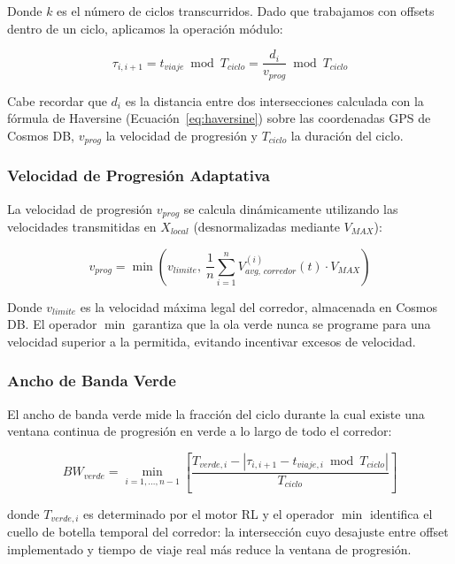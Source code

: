 \documentclass[12pt,a4paper,oneside]{report}
\begin{document}
Donde \(k\) es el número de ciclos transcurridos. Dado que trabajamos con offsets dentro de un ciclo, aplicamos la operación módulo:

\begin{equation}
\tau_{i,i + 1} = t_{viaje} \bmod T_{ciclo} = \frac{d_{i}}{v_{prog}} \bmod T_{ciclo}
\label{eq:offset}
\end{equation}

Cabe recordar que \(d_{i}\) es la distancia entre dos intersecciones calculada con la fórmula de Haversine (Ecuación~\ref{eq:haversine}) sobre las coordenadas GPS de Cosmos DB, \(v_{prog}\) la velocidad de progresión y \(T_{ciclo}\) la duración del ciclo.

\subsubsection{Velocidad de Progresión Adaptativa}

La velocidad de progresión \(v_{prog}\) se calcula dinámicamente utilizando las velocidades transmitidas en \(X_{local}\) (desnormalizadas mediante \(V_{MAX}\)):

\begin{equation}
v_{prog} = \min\!\left(v_{limite},\ \frac{1}{n}\sum_{i = 1}^{n}V_{avg,\,corredor}^{(i)}(t) \cdot V_{MAX}\right)
\label{eq:vprog}
\end{equation}

Donde \(v_{limite}\) es la velocidad máxima legal del corredor, almacenada en Cosmos DB. El operador \(\min\) garantiza que la ola verde nunca se programe para una velocidad superior a la permitida, evitando incentivar excesos de velocidad.

\subsubsection{Ancho de Banda Verde}

El ancho de banda verde mide la fracción del ciclo durante la cual existe una ventana continua de progresión en verde a lo largo de todo el corredor:

\begin{equation}
BW_{verde} = \min_{i = 1, \ldots, n - 1}\left[\frac{T_{verde,i} - \left| \tau_{i,i + 1} - t_{viaje,i} \bmod T_{ciclo} \right|}{T_{ciclo}}\right]
\label{eq:bwverde}
\end{equation}

donde \(T_{verde,i}\) es determinado por el motor RL y el operador \(\min\) identifica el cuello de botella temporal del corredor: la intersección cuyo desajuste entre offset implementado y tiempo de viaje real más reduce la ventana de progresión.
\end{document}
